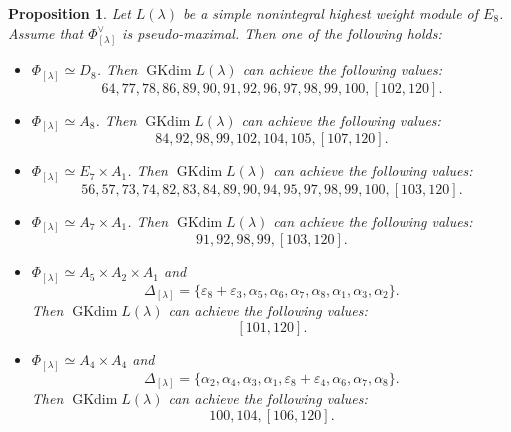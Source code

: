 \documentclass[reqno,12pt]{amsart}
\numberwithin{equation}{section}
\theoremstyle{plain}
\newtheorem{Prop}[Thm]{Proposition}
\theoremstyle{definition}
\newcommand{\lam}{\lambda}
\newcommand{\ep}{\varepsilon}
\newcommand{\gkd}{\operatorname{GKdim}}
\begin{document}
\begin{Prop} Let $L(\lam)$ be a simple nonintegral highest weight module of $E_8$. Assume that $\Phi_{[\lam]}^\vee$ is pseudo-maximal.
	Then
    one of the following holds: 
    \begin{itemize}
	\item[(1)]  $\Phi_{[\lam]}\simeq D_8$. Then 
 $ \gkd L(\lam) $ can achieve the following values:
$$64,77,78,86,89,90,91,92,96,97,98,99,100,[102,120].$$













\item[(2)] $\Phi_{[\lam]}\simeq A_8$. Then
 $ \gkd L(\lam) $ can achieve the following values:
$$84,92,98,99,102,104, 105, [107,120].$$








\item[(3)] $\Phi_{[\lam]}\simeq E_7\times A_1$.
 Then 
 $ \gkd L(\lam) $ can achieve the following values:
$$56,57,73,74,82,83,84,89,90,94,95,97,98,99,100,[103,120].$$



\item[(4)] $\Phi_{[\lam]}\simeq A_7\times A_1$.
 Then 
 $ \gkd L(\lam) $ can achieve the following values:
$$91,92,98,99,[103,120].$$









\item[(5)] $\Phi_{[\lam]}\simeq A_5\times A_2\times A_1$ and 
 $$\Delta_{[\lam]}=\{\ep_8+\ep_3,\alpha_5,\alpha_6,\alpha_7,\alpha_8,\alpha_1,\alpha_3,\alpha_2\}.$$ Then 
 $ \gkd L(\lam) $ can achieve the following values:
$$[101,120].$$







\item[(6)] $\Phi_{[\lam]}\simeq  A_4\times A_4$ and 
 $$\Delta_{[\lam]}=\{\alpha_2,\alpha_4,\alpha_3,\alpha_1,\ep_8+\ep_4,\alpha_6,\alpha_7,\alpha_8\}.$$ Then 
 $ \gkd L(\lam) $ can achieve the following values:
$$100,104,[106,120].$$






\end{itemize}
\end{Prop}
\end{document}
